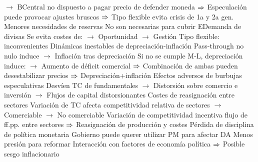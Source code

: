 \documentclass{nuevotema}
\begin{document}
\begin{esquemal}
				\4[] $\to$ BCentral no dispuesto a pagar precio de defender moneda
				\4[] $\Rightarrow$ Especulación puede provocar ajustes bruscos
				\4[] $\Rightarrow$ Tipo flexible evita crisis de 1a y 2a gen.
				\4 Menores necesidades de reservas
				\4[] No son necesarias para cubrir EDemanda de divisas
				\4[] Se evita costes de:
				\4[] $\to$ Oportunidad
				\4[] $\to$ Gestión
			\3 Tipo flexible: inconvenientes
				\4 Dinámicas inestables de depreciación-inflación
				\4[] Pass-through no nulo induce
				\4[] $\to$ Inflación tras depreciación
				\4[] Si no se cumple M-L, depreciación induce:
				\4[] $\to$ Aumento de déficit comercial
				\4[] $\Rightarrow$ Combinación de ambas pueden desestabilizar precios
				\4[] $\Rightarrow$ Depreciación+inflación
				\4 Efectos adversos de burbujas especulativas
				\4[] Desvíen TC de fundamentales
				\4[] $\to$ Distorsión sobre comercio e inversión
				\4[] $\to$ Flujos de capital distorsionantes
				\4 Costes de reasignación entre sectores
				\4[] Variación de TC afecta competitividad relativa de sectores
				\4[] $\to$ Comerciable
				\4[] $\to$ No comerciable
				\4[] Variación de competitividad incentiva flujo de ff.pp. entre sectores
				\4[] $\Rightarrow$ Reasignación de producción y costes 
				\4 Pérdida de disciplina de política monetaria
				\4[] Gobierno puede querer utilizar PM para afectar DA
				\4[] Menos presión para reformar
				\4[] Interacción con factores de economía política
				\4[] $\Rightarrow$ Posible sesgo inflacionario


\end{esquemal}
\end{document}
